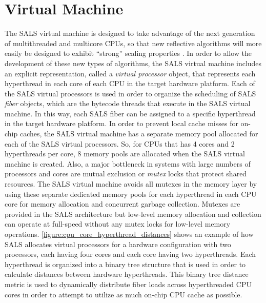 \section{Virtual Machine}

The SALS virtual machine is designed to take advantage of the next
generation of multithreaded and multicore CPUs, so that new reflective
algorithms will more easily be designed to exhibit ``strong'' scaling
properties \cite[]{sodan:2010}.  In order to allow the development of
these new types of algorithms, the SALS virtual machine includes an
explicit representation, called a {\emph{virtual processor}} object,
that represents each hyperthread in each core of each CPU in the
target hardware platform.  Each of the SALS virtual processors is used
in order to organize the scheduling of SALS {\emph{fiber}} objects,
which are the bytecode threads that execute in the SALS virtual
machine.  In this way, each SALS fiber can be assigned to a specific
hyperthread in the target hardware platform.  In order to prevent
local cache misses for on-chip caches, the SALS virtual machine has a
separate memory pool allocated for each of the SALS virtual
processors.  So, for CPUs that has 4 cores and 2 hyperthreads per
core, 8 memory pools are allocated when the SALS virtual machine is
created.  Also, a major bottleneck in systems with large numbers of
processors and cores are mutual exclusion or {\emph{mutex}} locks that
protect shared resources.  The SALS virtual machine avoids all mutexes
in the memory layer by using these separate dedicated memory pools for
each hyperthread in each CPU core for memory allocation and concurrent
garbage collection.  Mutexes are provided in the SALS architecture but
low-level memory allocation and collection can operate at full-speed
without any mutex locks for low-level memory operations.
{\mbox{\autoref{figure:cpu_core_hyperthread_distances}}} shows an
example of how SALS allocates virtual processors for a hardware
configuration with two processors, each having four cores and each
core having two hyperthreads.  Each hyperthread is organized into a
binary tree structure that is used in order to calculate distances
between hardware hyperthreads.  This binary tree distance metric is
used to dynamically distribute fiber loads across hyperthreaded CPU
cores in order to attempt to utilize as much on-chip CPU cache as
possible.
